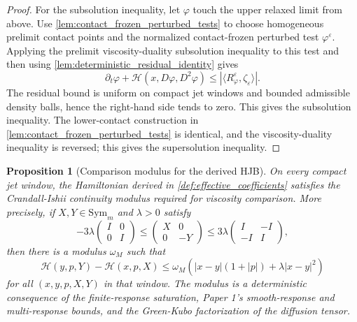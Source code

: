 \documentclass[11pt]{amsart}
\newtheorem{proposition}[theorem]{Proposition}
\theoremstyle{definition}
\theoremstyle{remark}
\newcommand{\Hcal}{\mathcal H}
\begin{document}
\begin{proof}
For the subsolution inequality, let $\varphi$ touch the upper relaxed limit from
above.  Use \cref{lem:contact_frozen_perturbed_tests} to choose homogeneous
prelimit contact points and the normalized contact-frozen perturbed test
$\varphi^\varepsilon$.  Applying the prelimit viscosity-duality subsolution
inequality to this test and then using
\cref{lem:deterministic_residual_identity} gives
\[
  \partial_t\varphi+\Hcal(x,D\varphi,D^2\varphi)
  \le
  |\langle R^\varepsilon_\varphi,\zeta_\varepsilon\rangle|.
\]
The residual bound is uniform on compact jet windows and bounded admissible
density balls, hence the right-hand side tends to zero.  This gives the
subsolution inequality.  The lower-contact construction in
\cref{lem:contact_frozen_perturbed_tests} is identical, and the
viscosity-duality inequality is reversed; this gives the supersolution
inequality.
\end{proof}

\begin{proposition}[Comparison modulus for the derived HJB]
\label{prop:comparison_modulus}
On every compact jet window, the Hamiltonian derived in
\cref{def:effective_coefficients} satisfies the Crandall-Ishii continuity
modulus required for viscosity comparison.  More precisely, if
$X,Y\in\mathrm{Sym}_m$ and $\lambda>0$ satisfy
\begin{equation}
  -3\lambda
  \begin{pmatrix} I&0\\0&I\end{pmatrix}
  \le
  \begin{pmatrix} X&0\\0&-Y\end{pmatrix}
  \le
  3\lambda
  \begin{pmatrix} I&-I\\-I&I\end{pmatrix},
\end{equation}
then there is a modulus $\omega_M$ such that
\begin{equation}
  \Hcal(y,p,Y)-\Hcal(x,p,X)
  \le
  \omega_M\!\left(|x-y|(1+|p|)+\lambda |x-y|^2\right)
\end{equation}
for all $(x,y,p,X,Y)$ in that window.  The modulus is a deterministic
consequence of the finite-response saturation, Paper 1's smooth-response and
multi-response bounds, and the Green-Kubo factorization of the diffusion tensor.
\end{proposition}
\end{document}
